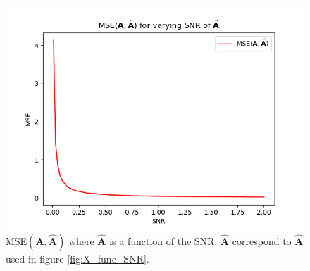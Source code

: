 \begin{figure}[H]
\begin{widepage}
\begin{minipage}[t]{.45\textwidth}
		\includegraphics[scale=0.5]{figures/ch_6/A_func_SNR.png}
		\caption{MSE$(\mathbf{A}, \hat{\mathbf{A}})$ where $\hat{\mathbf{A}}$ is a function of the SNR. $\hat{\mathbf{A}}$ correspond to $\hat{\mathbf{A}}$ used in figure \ref{fig:X_func_SNR}.}
		\label{fig:A_func_SNR}
    \end{minipage}
\end{widepage}
\end{figure}
\noindent